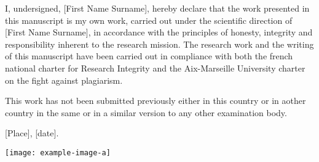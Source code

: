 \iffalse
    Je soussigné, [Prénom Nom], %
    déclare par la présente que le travail présenté dans ce manuscrit est mon propre travail, réalisé sous la direction scientifique de [Prénom Nom], %
    dans le respect des principes d’honnêteté, d'intégrité et de responsabilité inhérents à la mission de recherche. Les travaux de recherche et la rédaction de ce manuscrit ont été réalisés dans le respect à la fois de la charte nationale de déontologie des métiers de la recherche et de la charte d’Aix-Marseille Université relative à la lutte contre le plagiat.
    
    Ce travail n'a pas été précédemment soumis en France ou à l'étranger dans une version identique ou similaire à un organisme examinateur.
    
    Fait à [ville] le [date].
    
    \begin{flushright}
    \texttt{[image: example-image-a]}
    \end{flushright}
\fi

\iftrue
    I, undersigned, [First Name Surname], %
    hereby declare that the work presented in this manuscript is my own work, carried out under the scientific direction of [First Name Surname], %
    in accordance with the principles of honesty, integrity and responsibility inherent to the research mission. The research work and the writing of this manuscript have been carried out in compliance with both the french national charter for Research Integrity and the Aix-Marseille University charter on the fight against plagiarism.
    
    This work has not been submitted previously either in this country or in aother country in the same or in a similar version to any other examination body.
    
    [Place], [date].
    
    \begin{flushright}
    \texttt{[image: example-image-a]}
    \end{flushright}
\fi

